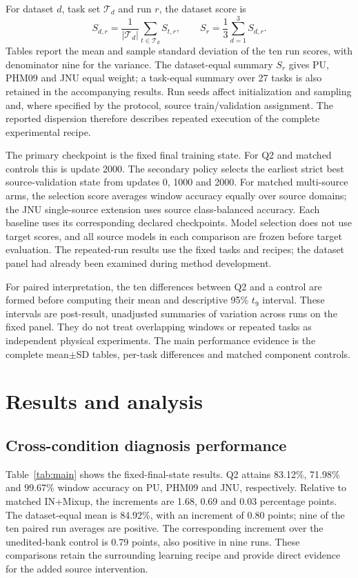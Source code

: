 \documentclass[a4paper,fleqn]{cas-sc}
\begin{document}
For dataset $d$, task set $\mathcal T_d$ and run $r$, the dataset score is
\begin{equation}
 S_{d,r}=\frac{1}{|\mathcal T_d|}\sum_{t\in\mathcal T_d}S_{t,r},\qquad
 S_r=\frac13\sum_{d=1}^{3}S_{d,r}.
 \label{eq:aggregation}
\end{equation}
Tables report the mean and sample standard deviation of the ten run scores, with denominator nine for the variance. The dataset-equal summary $S_r$ gives PU, PHM09 and JNU equal weight; a task-equal summary over 27 tasks is also retained in the accompanying results. Run seeds affect initialization and sampling and, where specified by the protocol, source train/validation assignment. The reported dispersion therefore describes repeated execution of the complete experimental recipe.

The primary checkpoint is the fixed final training state. For Q2 and matched controls this is update 2000. The secondary policy selects the earliest strict best source-validation state from updates 0, 1000 and 2000. For matched multi-source arms, the selection score averages window accuracy equally over source domains; the JNU single-source extension uses source class-balanced accuracy. Each baseline uses its corresponding declared checkpoints. Model selection does not use target scores, and all source models in each comparison are frozen before target evaluation. The repeated-run results use the fixed tasks and recipes; the dataset panel had already been examined during method development.

For paired interpretation, the ten differences between Q2 and a control are formed before computing their mean and descriptive 95\% $t_9$ interval. These intervals are post-result, unadjusted summaries of variation across runs on the fixed panel. They do not treat overlapping windows or repeated tasks as independent physical experiments. The main performance evidence is the complete mean$\pm$SD tables, per-task differences and matched component controls.

\section{Results and analysis}
\subsection{Cross-condition diagnosis performance}


Table~\ref{tab:main} shows the fixed-final-state results. Q2 attains 83.12\%, 71.98\% and 99.67\% window accuracy on PU, PHM09 and JNU, respectively. Relative to matched IN+Mixup, the increments are 1.68, 0.69 and 0.03 percentage points. The dataset-equal mean is 84.92\%, with an increment of 0.80 points; nine of the ten paired run averages are positive. The corresponding increment over the unedited-bank control is 0.79 points, also positive in nine runs. These comparisons retain the surrounding learning recipe and provide direct evidence for the added source intervention.
\end{document}

